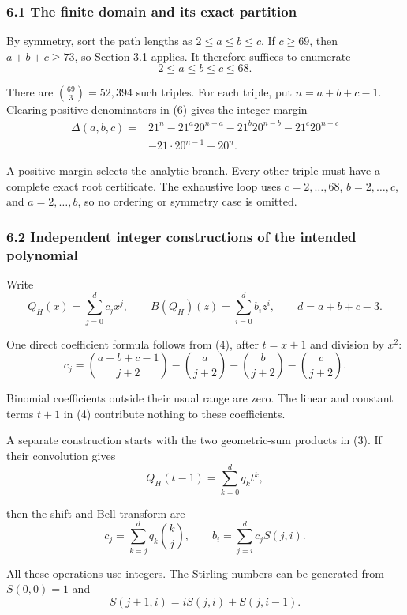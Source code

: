 \documentclass[
  11pt,
  a4paper,
]{article}
\begin{document}
\subsubsection{6.1 The finite domain and its exact
partition}\label{the-finite-domain-and-its-exact-partition}

By symmetry, sort the path lengths as \(2\leq a\leq b\leq c\). If
\(c\geq69\), then \(a+b+c\geq73\), so Section 3.1 applies. It therefore
suffices to enumerate
\nopagebreak
\[
2\leq a\leq b\leq c\leq68.
\]

There are \(\binom{69}{3}=52,394\) such triples. For each triple, put
\(n=a+b+c-1\). Clearing positive denominators in (6) gives the integer
margin
\nopagebreak
\[
\begin{aligned}
\Delta(a,b,c)={}&21^n
-21^a20^{n-a}-21^b20^{n-b}-21^c20^{n-c}\\
&-21\cdot20^{n-1}-20^n.
\end{aligned}\tag{19}
\]

A positive margin selects the analytic branch. Every other triple must
have a complete exact root certificate. The exhaustive loop uses
\(c=2,\ldots,68\), \(b=2,\ldots,c\), and \(a=2,\ldots,b\), so no
ordering or symmetry case is omitted.

\subsubsection{6.2 Independent integer constructions of the intended
polynomial}\label{independent-integer-constructions-of-the-intended-polynomial}

Write
\nopagebreak
\[
Q_H(x)=\sum_{j=0}^d c_jx^j,\qquad
B(Q_H)(z)=\sum_{i=0}^d b_iz^i,
\qquad d=a+b+c-3.
\]

One direct coefficient formula follows from (4), after \(t=x+1\) and
division by \(x^2\):
\nopagebreak
\[
c_j=\binom{a+b+c-1}{j+2}
-\binom a{j+2}-\binom b{j+2}-\binom c{j+2}.\tag{20}
\]

Binomial coefficients outside their usual range are zero. The linear and
constant terms \(t+1\) in (4) contribute nothing to these coefficients.

A separate construction starts with the two geometric-sum products in
(3). If their convolution gives
\nopagebreak
\[
Q_H(t-1)=\sum_{k=0}^d q_kt^k,
\]

then the shift and Bell transform are
\nopagebreak
\[
c_j=\sum_{k=j}^d q_k\binom kj,\qquad
b_i=\sum_{j=i}^d c_jS(j,i).\tag{21}
\]

All these operations use integers. The Stirling numbers can be generated
from \(S(0,0)=1\) and
\nopagebreak
\[
S(j+1,i)=iS(j,i)+S(j,i-1).
\]
\end{document}
